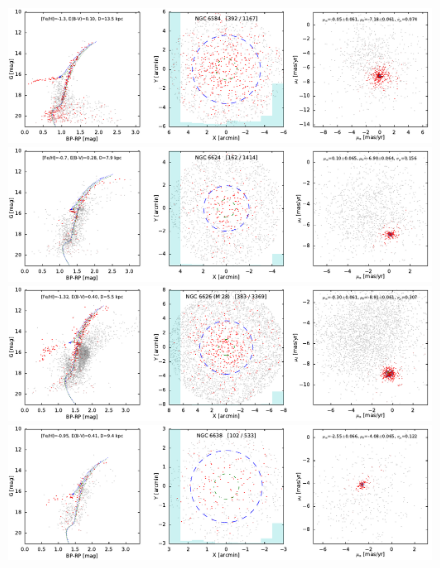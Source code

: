 \documentclass[usenatbib]{mnras}
\begin{document}
\clearpage\begin{figure}
\contcaption{}
\includegraphics{figs/NGC_6584.pdf}
\includegraphics{figs/NGC_6624.pdf}
\includegraphics{figs/NGC_6626_M_28.pdf}
\includegraphics{figs/NGC_6638.pdf}
\end{figure}
\end{document}
